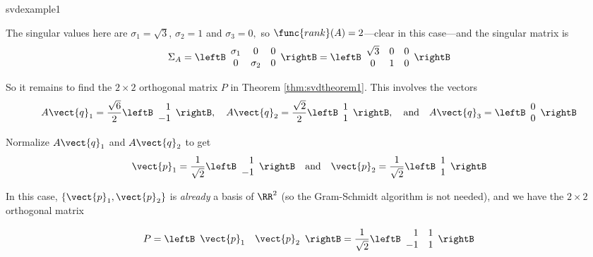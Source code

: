 \begin{example}{}{svdexample1}
\begin{solution}
\noindent The singular values here are $\sigma_{1}=\sqrt{3}$, $\sigma_{2}=1 $ and $\sigma_{3}=0,$ so $\func{rank}(A)=2$---clear in this case---and the singular matrix is
\begin{equation*}
\Sigma_{A}=
\leftB
\begin{array}{ccc}
\sigma_{1} & 0 & 0 \\ 
0 & \sigma_{2} & 0
\end{array}
\rightB =\leftB
\begin{array}{ccc}
\sqrt{3} & 0 & 0 \\ 
0 & 1 & 0
\end{array}
\rightB 
\end{equation*}

\noindent So it remains to find the $2\times 2$ orthogonal matrix $P$ in
Theorem \ref{thm:svdtheorem1}. This involves the vectors 
\begin{equation*}
A\vect{q}_{1}=\frac{\sqrt{6}}{2}
\leftB 
\begin{array}{r}
1 \\ 
-1
\end{array}
\rightB,\quad  A\vect{q}_{2}=\frac{\sqrt{2}}{2}
\leftB 
\begin{array}{c}
1 \\ 
1
\end{array}
\rightB ,\quad  \mbox{and} \quad A\vect{q}_{3}=
\leftB 
\begin{array}{c}
0 \\ 
0
\end{array}
\rightB 
\end{equation*}

\noindent Normalize $A\vect{q}_{1}$ and $A\vect{q}_{2}$ to get
\begin{equation*}
\vect{p}_{1}=\frac{1}{\sqrt{2}}
\leftB 
\begin{array}{r}
1 \\ 
-1
\end{array}
\rightB  \quad  \mbox{and} \quad \vect{p}_{2}=\frac{1}{\sqrt{2}}
\leftB
\begin{array}{c}
1 \\ 
1
\end{array}
\rightB 
\end{equation*}

\noindent In this case, $\{\vect{p}_{1},\vect{p}_{2}\}$ is \emph{already}
a basis of $\RR^{2}$ (so the Gram-Schmidt algorithm is not needed),
and we have the $2\times 2$ orthogonal matrix 

\begin{equation*}
P=\leftB \begin{array}{cc} \vect{p}_{1} & \vect{p}_{2} \end{array}\rightB=\frac{1}{\sqrt{2}}
\leftB 
\begin{array}{rr}
1 & 1 \\ 
-1 & 1
\end{array}
\rightB 
\end{equation*}


\end{solution}
\end{example}
